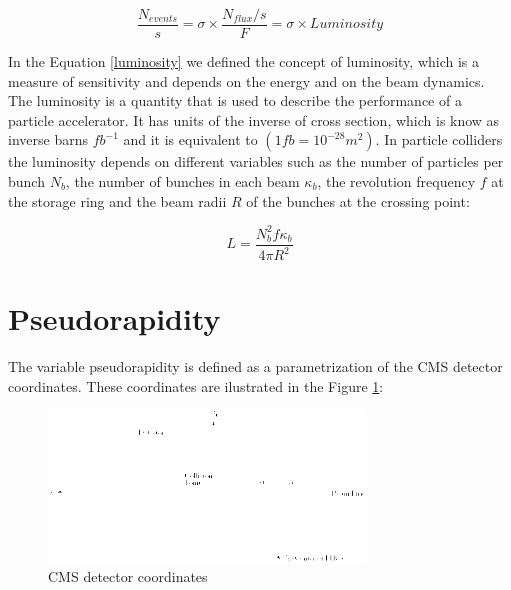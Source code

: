  \begin{equation}
 \label{luminosity}
  \frac{N_{events}}{s} = \sigma \times \frac{N_{flux}/s}{F} = \sigma \times Luminosity
 \end{equation}

 In the Equation \ref{luminosity} we defined the concept of luminosity, which is a measure of sensitivity and depends on the energy and on the beam dynamics.  The luminosity is a quantity that is used to 
 describe the performance of a particle accelerator. It has units of the inverse of cross section, which is know as inverse barns $fb^{-1}$ and it is equivalent to $(1 fb = 10^{-28} m^2)$. 
 In particle colliders the 
 luminosity depends on different variables such as the number of particles per bunch $N_b$, the number of bunches in each beam $\kappa_b$, the revolution frequency $f$ at the storage ring and the beam radii 
 $R$ of the bunches at the crossing point:
 
 \begin{equation}
  L = \frac{N_b^2 f \kappa_b}{4\pi R^2} 
 \end{equation}

 \section{Pseudorapidity}
 
 The variable pseudorapidity is defined as a parametrization of the CMS detector coordinates. These coordinates are ilustrated in the Figure \ref{CMSCoordinates}:
 
 
 \begin{figure}[h]
 \label{CMSCoordinates}
 \centering
 \caption{CMS detector coordinates}
 \includegraphics[width=0.75\textwidth]{./Capitulos/VariableDefinitions/CMS_coordinates}  
 \end{figure}


